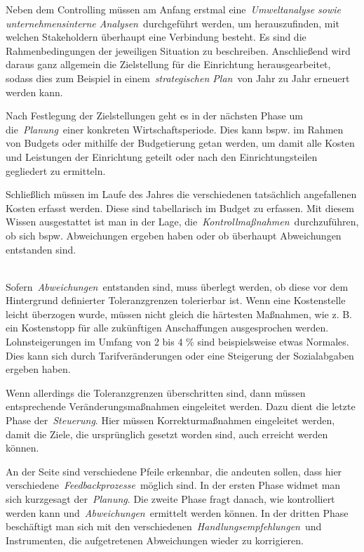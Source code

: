 \documentclass[
  letterpaper,
]{book}
\begin{document}
Neben dem Controlling müssen am Anfang erstmal eine~\emph{Umweltanalyse
sowie unternehmensinterne Analysen}~durchgeführt werden, um
herauszufinden, mit welchen Stakeholdern überhaupt eine Verbindung
besteht. Es sind die Rahmenbedingungen der jeweiligen Situation zu
beschreiben. Anschließend wird daraus ganz allgemein die Zielstellung
für die Einrichtung herausgearbeitet, sodass dies zum Beispiel in
einem~\emph{strategischen Plan}~von Jahr zu Jahr erneuert werden kann.

Nach Festlegung der Zielstellungen geht es in der nächsten Phase um
die~\emph{Planung}~einer konkreten Wirtschaftsperiode. Dies kann bspw.
im Rahmen von Budgets oder mithilfe der Budgetierung getan werden, um
damit alle Kosten und Leistungen der Einrichtung geteilt oder nach den
Einrichtungsteilen gegliedert zu ermitteln.

Schließlich müssen im Laufe des Jahres die verschiedenen tatsächlich
angefallenen Kosten erfasst werden. Diese sind tabellarisch im Budget zu
erfassen. Mit diesem Wissen ausgestattet ist man in der Lage,
die~\emph{Kontrollmaßnahmen}~durchzuführen, ob sich bspw. Abweichungen
ergeben haben oder ob überhaupt Abweichungen entstanden sind.\\
\strut \\
Sofern~\emph{Abweichungen}~entstanden sind, muss überlegt werden, ob
diese vor dem Hintergrund definierter Toleranzgrenzen tolerierbar ist.
Wenn eine Kostenstelle leicht überzogen wurde, müssen nicht gleich die
härtesten Maßnahmen, wie z. B. ein Kostenstopp für alle zukünftigen
Anschaffungen ausgesprochen werden. Lohnsteigerungen im Umfang von 2 bis
4 \% sind beispielsweise etwas Normales. Dies kann sich durch
Tarifveränderungen oder eine Steigerung der Sozialabgaben ergeben haben.

Wenn allerdings die Toleranzgrenzen überschritten sind, dann müssen
entsprechende Veränderungsmaßnahmen eingeleitet werden. Dazu dient die
letzte Phase der~\emph{Steuerung}. Hier müssen Korrekturmaßnahmen
eingeleitet werden, damit die Ziele, die ursprünglich gesetzt worden
sind, auch erreicht werden können.

An der Seite sind verschiedene Pfeile erkennbar, die andeuten sollen,
dass hier verschiedene~\emph{Feedbackprozesse}~möglich sind. In der
ersten Phase widmet man sich kurzgesagt der~\emph{Planung}. Die zweite
Phase fragt danach, wie kontrolliert werden kann
und~\emph{Abweichungen}~ermittelt werden können. In der dritten Phase
beschäftigt man sich mit den
verschiedenen~\emph{Handlungsempfehlungen}~und Instrumenten, die
aufgetretenen Abweichungen wieder zu korrigieren.
\end{document}
